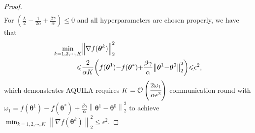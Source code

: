 \documentclass[lettersize,journal]{IEEEtran}
\begin{document}
\begin{proof}
\begin{equation}
\begin{aligned}
\end{aligned}
\end{equation}
For $\left(\frac{L}{2}-\frac{1}{2 \alpha}+\frac{\beta\gamma}{\alpha} \right) \leqslant 0$ and all hyperparameters are chosen properly, we have that
\begin{equation}
\thinmuskip=0mu
\medmuskip=0mu
\thickmuskip=0mu
\begin{aligned}
\min _{k=1, 2, \cdots, K} &\left\|\nabla f(\boldsymbol{\theta}^{k})\right\|_2^2 \\ \leqslant & \frac{2}{\alpha K}\left(f(\boldsymbol{\theta}^{1})-f(\boldsymbol{\theta}^{*}) + \frac{\beta\gamma}{\alpha} \left\|\boldsymbol{\theta}^{1} - \boldsymbol{\theta}^{0}\right\|_2^2\right) \leqslant \epsilon^2,
\end{aligned}
\end{equation}
which demonstrates AQUILA requires $K = \mathcal{O}\left(\cfrac{2 \omega_1}{\alpha\epsilon^2}  \right)$ communication round with $\omega_1 = f(\boldsymbol{\theta}^{1})-f(\boldsymbol{\theta}^{*})+\frac{\beta\gamma}{\alpha} \left\|\boldsymbol{\theta}^{1} - \boldsymbol{\theta}^{0}\right\|_2^2$ to achieve $\min _{k=1, 2, \cdots, K} \left\|\nabla f(\boldsymbol{\theta}^{k})\right\|_2^2 \leqslant \epsilon^2$.
\end{proof}
\end{document}
